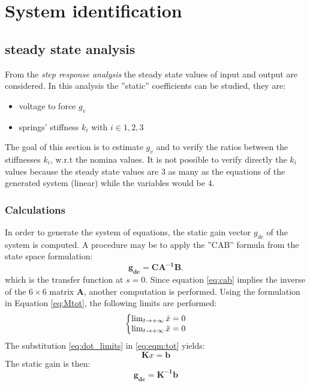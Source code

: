 \documentclass[twosided,a4paper]{article}           %
\makeatletter
\newenvironment{sistema}%
{\left\lbrace\begin{array}{@{}l@{}}}%
	{\end{array}\right.}
\makeatother
\begin{document}
\section{System identification}
	
\subsection{steady state analysis}
\label{sec:step}
From the \textit{step response analysis} the steady state values of input and output are considered. In this analysis the ''static'' coefficients can be studied, they are:
\begin{itemize}
	\item voltage to force $g_v$
	\item springs' stiffness $k_i$ with $i \in 1,2,3$
\end{itemize} 
The goal of this section is to estimate $g_v$ and to verify the ratios between the stiffnesses $k_i$, w.r.t the nomina values. It is not possible to verify directly the $k_i$ values because the steady state values are $3$ as many as the equations of the generated system (linear) while the variables would be $4$.
\subsubsection{Calculations}
In order to generate the system of equations, the static gain vector $g_{dc}$ of the system is computed. A procedure may be to apply the ''CAB'' formula from the state space formulation:
\begin{equation}
\label{eq:cab}
	\bm{g_{dc}} =	\bm{CA^{-1}B}.
\end{equation}
which is the transfer function at $s = 0$. Since equation \ref{eq:cab} implies the inverse of the $6 \times 6$ matrix $\bm A$, another computation is performed. Using the formulation in Equation \ref{eq:Mtot}, the following limits are performed:
\begin{equation}
	\begin{sistema}
	\lim_{t \to + \infty}{\dot{x}}  = 0  \\
	\lim_{t \to + \infty}{\ddot{x}} = 0
	\end{sistema}
	\label{eq:dot_limits}
\end{equation}
The substitution \ref{eq:dot_limits} in \ref{eq:eqm:tot} yields:
\begin{equation}
\bm K x = \bm b
\label{eq:dot0}
\end{equation} The static gain is then:
\begin{equation}
	\bm{g_{dc}} = \bm{K^{-1}}\bm{b}
\end{equation}
\end{document}
